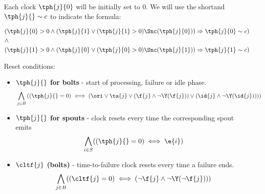 Each clock $ \tph{j}{0} $ will be initially set to 0. We will use the shortand $ \tph{j}{} \sim c$ to indicate the formula:


\begin{align*}
%
&  (\tph{j}{0} >  0 \land  (\tph{j}{1} \lor (\tph{j}{1} > 0) \Snc (\tph{j}{0})) \Rightarrow \tph{j}{0} \sim c )\\
%
& \land \\
%
& (\tph{j}{1} >  0 \land  (\tph{j}{0} \lor (\tph{j}{0} > 0) \Snc (\tph{j}{1})) \Rightarrow \tph{j}{1} \sim c )\\
%
\end{align*} 


Reset conditions:

\begin{itemize}
 \item \textbf{ $ \tph{j}{} $ for bolts} - start of processing, failure or idle phase.
\begin{align*}
%
& \bigwedge_{
	\begin{subarray}{c}
	j \in B\\
	\end{subarray}
}
\left(
(\tph{j}{} =  0) \iff %
\left(\ori \lor \ta{j} \lor %
(\f{j} \land \lnot \Y (\f{j}) )  \lor %
(\id{j} \land \lnot \Y (\id{j}) ) \right) 
\right)\\ 
%
\end{align*} 
 \item \textbf{$ \tph{j}{} $ for spouts } - clock resets every time the corresponding spout emits
\begin{align*}
%
& \bigwedge_{
	\begin{subarray}{c}
	i \in S\\
	\end{subarray}
}
((\tph{j}{} =  0) \iff 
\e{i})\\ 
%
\end{align*} 
 \item \textbf{$ \cltf{j} $ (bolts)} - time-to-failure clock resets every time a failure ends.
\begin{align*}
%
& \bigwedge_{
	\begin{subarray}{c}
	j \in B\\
	\end{subarray}
}
((\cltf{j} =  0) \iff 
 (\lnot \f{j} \land \lnot \Y (\lnot \f{j})))\\ 
%
\end{align*} 
\end{itemize}

